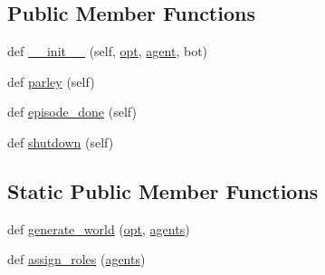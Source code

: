 \subsection*{Public Member Functions}
\begin{DoxyCompactItemize}
\item 
def \hyperlink{classparlai_1_1messenger_1_1tasks_1_1chatbot_1_1worlds_1_1MessengerBotChatTaskWorld_a6b6d558d3d6438b34eac412b315524bc}{\+\_\+\+\_\+init\+\_\+\+\_\+} (self, \hyperlink{classparlai_1_1core_1_1worlds_1_1World_a3640d92718acd3e6942a28c1ab3678bd}{opt}, \hyperlink{classparlai_1_1messenger_1_1tasks_1_1chatbot_1_1worlds_1_1MessengerBotChatTaskWorld_ae6cb9315b1f72666d357796ab21345d9}{agent}, bot)
\item 
def \hyperlink{classparlai_1_1messenger_1_1tasks_1_1chatbot_1_1worlds_1_1MessengerBotChatTaskWorld_aa6fca182a348aaeefda3a63358ba5575}{parley} (self)
\item 
def \hyperlink{classparlai_1_1messenger_1_1tasks_1_1chatbot_1_1worlds_1_1MessengerBotChatTaskWorld_a38ca7b1c5b051dbd71c0c7b4e8eb1d07}{episode\+\_\+done} (self)
\item 
def \hyperlink{classparlai_1_1messenger_1_1tasks_1_1chatbot_1_1worlds_1_1MessengerBotChatTaskWorld_a17adc8275479c35b5ccb46e803ce4e2a}{shutdown} (self)
\end{DoxyCompactItemize}
\subsection*{Static Public Member Functions}
\begin{DoxyCompactItemize}
\item 
def \hyperlink{classparlai_1_1messenger_1_1tasks_1_1chatbot_1_1worlds_1_1MessengerBotChatTaskWorld_a157b8abe4ccd3162acf89440b0cb2bfb}{generate\+\_\+world} (\hyperlink{classparlai_1_1core_1_1worlds_1_1World_a3640d92718acd3e6942a28c1ab3678bd}{opt}, \hyperlink{classparlai_1_1core_1_1worlds_1_1World_a728f75194cc26ea4035047c46cf62608}{agents})
\item 
def \hyperlink{classparlai_1_1messenger_1_1tasks_1_1chatbot_1_1worlds_1_1MessengerBotChatTaskWorld_a9417988341c0f0297d7197d523f4fc09}{assign\+\_\+roles} (\hyperlink{classparlai_1_1core_1_1worlds_1_1World_a728f75194cc26ea4035047c46cf62608}{agents})
\end{DoxyCompactItemize}
